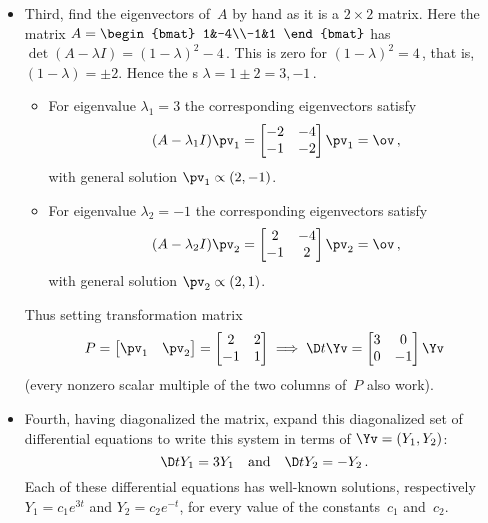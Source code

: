 \begin{itemize}
\item Third, find the eigenvectors of~\(A\) by hand as it is a \(2\times2\) matrix. 
Here the matrix \(A=\begin{bmat} 1&-4\\-1&1 \end{bmat}\) has  \(\det(A-\lambda I)=(1-\lambda)^2-4\)\,.
This is zero for \((1-\lambda)^2=4\)\,, that is, \((1-\lambda)=\pm2\).
Hence the s \(\lambda=1\pm2=3,-1\)\,.
\begin{itemize}
\item For eigenvalue \(\lambda_1=3\) the corresponding eigenvectors satisfy
\begin{equation*}
(A-\lambda_1I)\pv_1=\begin{bmatrix} -2&-4\\-1&-2 \end{bmatrix}\pv_1=\ov\,,
\end{equation*}
with general solution \(\pv_1\propto(2,-1)\).

\item For eigenvalue \(\lambda_2=-1\) the corresponding eigenvectors satisfy
\begin{equation*}
(A-\lambda_2I)\pv_2=\begin{bmatrix} 2&-4\\-1&2 \end{bmatrix}\pv_2=\ov\,,
\end{equation*}
with general solution \(\pv_2\propto(2,1)\).
\end{itemize}
Thus setting transformation matrix 
\begin{equation*}
P=\begin{bmatrix} \pv_1&\pv_2 \end{bmatrix}
=\begin{bmatrix} 2&2\\-1&1 \end{bmatrix}
\implies \D t\Yv=\begin{bmatrix} 3&0\\0&-1 \end{bmatrix}\Yv
\end{equation*}
(every nonzero scalar multiple of the two columns of~\(P\) also work).

\item Fourth, having diagonalized the matrix, expand this diagonalized set of differential equations to write this system in terms of  \(\Yv=(Y_1,Y_2)\): 
\begin{equation*}
\D t{Y_1}=3Y_1 \quad\text{and}\quad \D t{Y_2}=-Y_2\,.
\end{equation*}
Each of these differential equations has well-known  solutions, respectively \(Y_1=c_1e^{3t}\) and \(Y_2=c_2e^{-t}\),  for every value of the constants~\(c_1\) and~\(c_2\).


\end{itemize}
